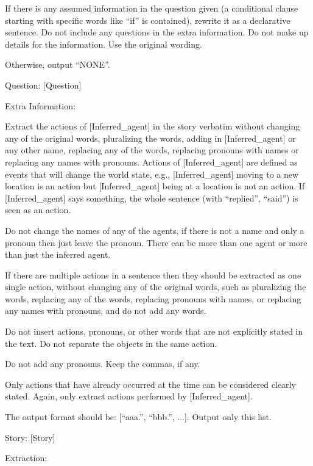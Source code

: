 \begin{tcolorbox}[
    breakable,
    colframe=green!40!black,
    colback=green!5,
    coltitle=white,
    fonttitle=\bfseries,
    title=Identifying extra information in the question,
    colbacktitle=green!40!black
]
If there is any assumed information in the question given (a conditional clause starting with specific words like ``if'' is contained), rewrite it as a declarative sentence. Do not include any questions in the extra information. Do not make up details for the information. Use the original wording.

Otherwise, output ``NONE''. \newline

Question: [Question]

Extra Information:
\end{tcolorbox}


\begin{tcolorbox}[
    breakable,
    colframe=green!40!black,
    colback=green!5,
    coltitle=white,
    fonttitle=\bfseries,
    title=Extracting actions of the main agent,
    colbacktitle=green!40!black
]
Extract the actions of [Inferred\_agent] in the story verbatim without changing any of the original words, pluralizing the words, adding in [Inferred\_agent] or any other name, replacing any of the words, replacing pronouns with names or replacing any names with pronouns. Actions of [Inferred\_agent] are defined as events that will change the world state, e.g., [Inferred\_agent] moving to a new location is an action but [Inferred\_agent] being at a location is not an action. If [Inferred\_agent] says something, the whole sentence (with ``replied'', ``said'') is seen as an action.

Do not change the names of any of the agents, if there is not a name and only a pronoun then just leave the pronoun. There can be more than one agent or more than just the inferred agent.

If there are multiple actions in a sentence then they should be extracted as one single action, without changing any of the original words, such as pluralizing the words, replacing any of the words, replacing pronouns with names, or replacing any names with pronouns, and do not add any words.

Do not insert actions, pronouns, or other words that are not explicitly stated in the text. Do not separate the objects in the same action.

Do not add any pronouns. Keep the commas, if any.

Only actions that have already occurred at the time can be considered clearly stated. Again, only extract actions performed by [Inferred\_agent].

The output format should be: [``aaa.'', ``bbb.'', ...]. Output only this list. \newline

Story: [Story]

Extraction:
\end{tcolorbox}




